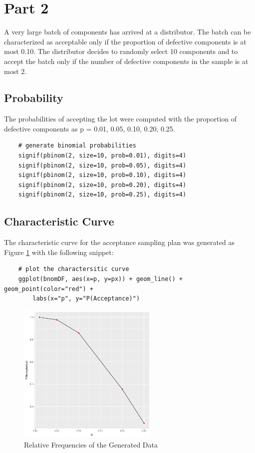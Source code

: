 \documentclass{article}
\begin{document}
    \section{Part 2}
    A very large batch of components has arrived at a distributor. The batch can be characterized as acceptable only if the proportion of defective components is at most 0.10. The distributor decides to randomly select 10 components and to accept the batch only if the number of defective components in the sample is at most 2.

        \subsection{Probability}
            The probabilities of accepting the lot were computed with the proportion of defective components as p = 0.01, 0.05, 0.10, 0.20, 0.25.

\begin{lstlisting}
    # generate binomial probabilities
    signif(pbinom(2, size=10, prob=0.01), digits=4)
    signif(pbinom(2, size=10, prob=0.05), digits=4)
    signif(pbinom(2, size=10, prob=0.10), digits=4)
    signif(pbinom(2, size=10, prob=0.20), digits=4)
    signif(pbinom(2, size=10, prob=0.25), digits=4)
\end{lstlisting}


        \subsection{Characteristic Curve}
            The characteristic curve for the acceptance sampling plan was generated as Figure \ref{fig:charcurve1} with the following snippet:

\begin{lstlisting}
    # plot the charactersitic curve
    ggplot(bnomDF, aes(x=p, y=px)) + geom_line() + geom_point(color="red") +
        labs(x="p", y="P(Acceptance)")
\end{lstlisting}

            \begin{figure}[h]
                \begin{center}
                    \includegraphics[width=0.6\textwidth]{charcurve1.png}
                    \caption{Relative Frequencies of the Generated Data} \label{fig:charcurve1}
                \end{center}
            \end{figure}
\end{document}
